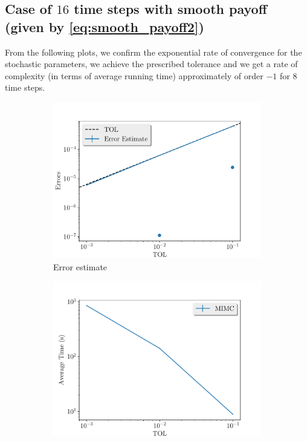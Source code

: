 \documentclass[11pt]{article}
\begin{document}
\newpage
\subsection{Case of $16$ time steps with smooth payoff (given by \eqref{eq:smooth_payoff2})}

From the following plots, we confirm the exponential rate of convergence for the stochastic parameters, we achieve the prescribed tolerance and  we get a rate of complexity (in terms of average running time) approximately of order $-1$ for $8$ time steps.

\begin{figure}[!h]
	\centering
	\begin{subfigure}{.5\textwidth}
		\centering
		\includegraphics[width=1\linewidth]{./figures/1D_BS_16_steps_smooth_second_payoff_eps_10_5/error_estimate.pdf}
		\caption{Error estimate}
		\label{fig:misc_1D_BS_16_steps_smooth_second_payoff_eps_10_5_sub1}
	\end{subfigure}%
	\begin{subfigure}{.5\textwidth}
		\centering
		\includegraphics[width=1\linewidth]{./figures/1D_BS_16_steps_smooth_second_payoff_eps_10_5/average_running_time.pdf}

\end{subfigure}
\end{figure}
\end{document}
